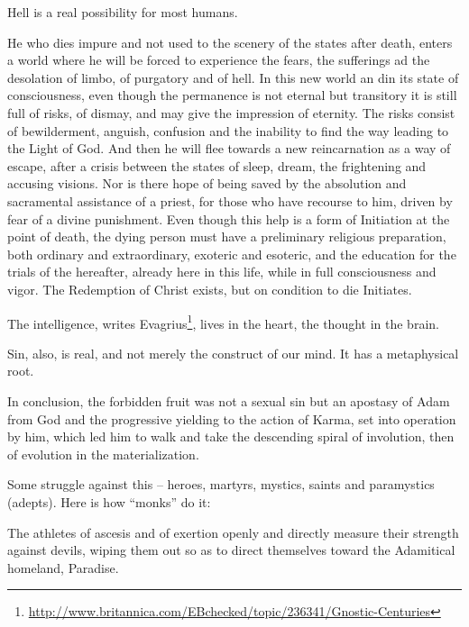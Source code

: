 Hell is a real possibility for most humans.

\begin{quotex}
He who dies impure and not used to the scenery of the states after death, enters a world where he will be forced to experience the fears, the sufferings ad the desolation of limbo, of purgatory and of hell. In this new world an din its state of consciousness, even though the permanence is not eternal but transitory it is still full of risks, of dismay, and may give the impression of eternity. The risks consist of bewilderment, anguish, confusion and the inability to find the way leading to the Light of God. And then he will flee towards a new reincarnation as a way of escape, after a crisis between the states of sleep, dream, the frightening and accusing visions. Nor is there hope of being saved by the absolution and sacramental assistance of a priest, for those who have recourse to him, driven by fear of a divine punishment. Even though this help is a form of Initiation at the point of death, the dying person must have a preliminary religious preparation, both ordinary and extraordinary, exoteric and esoteric, and the education for the trials of the hereafter, already here in this life, while in full consciousness and vigor. The Redemption of Christ exists, but on condition to die Initiates.
\end{quotex}


The intelligence, writes Evagrius\footnote{\url{http://www.britannica.com/EBchecked/topic/236341/Gnostic-Centuries}}, lives in the heart, the thought in the brain.

Sin, also, is real, and not merely the construct of our mind. It has a metaphysical root.

\begin{quotex}
In conclusion, the forbidden fruit was not a sexual sin but an apostasy of Adam from God and the progressive yielding to the action of Karma, set into operation by him, which led him to walk and take the descending spiral of involution, then of evolution in the materialization.
\end{quotex}


Some struggle against this -- heroes, martyrs, mystics, saints and paramystics (adepts). Here is how ``monks'' do it:

\begin{quotex}
The athletes of ascesis and of exertion openly and directly measure their strength against devils, wiping them out so as to direct themselves toward the Adamitical homeland, Paradise.
\end{quotex}


